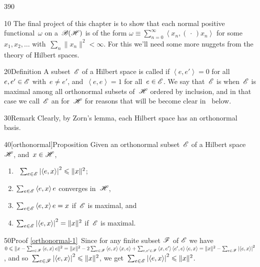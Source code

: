 \begin{parsec}{390}%
\begin{point}{10}%
The final project of this chapter
is to show that each normal positive functional~$\omega$ 
on a~$\mathscr{B}(\mathscr{H})$
	is of the form 
	$\omega\equiv \sum_{n=0}^\infty\left<x_n,(\,\cdot\,)x_n\right>$
	for some~$x_1,x_2,\dotsc$
	with~$\sum_n\|x_n\|^2<\infty$.
For this we'll need some more nuggets
from the theory of Hilbert spaces.
\end{point}
\begin{point}{20}{Definition}%
A subset~$\mathscr{E}$ of a Hilbert space
is called %
if $\left<e,e'\right>=0$
for all~$e,e'\in\mathscr{E}$ with~$e\neq e'$,
and~$\left<e,e\right>=1$
for all~$e\in\mathscr{E}$.
We say that~$\mathscr{E}$ is 
when~$\mathscr{E}$ is maximal
among all orthonormal  subsets of~$\mathscr{H}$
ordered by inclusion,
and in that case
we call~$\mathscr{E}$ an %
for~$\mathscr{H}$
for reasons that will be become clear in~
below.
\begin{point}{30}{Remark}%
Clearly, by Zorn's lemma,
each Hilbert space has an orthonormal basis.
\end{point}
\end{point}
\begin{point}{40}[orthonormal]{Proposition}%
Given an orthonormal subset~$\mathscr{E}$
of a Hilbert space~$\mathscr{H}$,
and~$x\in \mathscr{H}$,
\begin{enumerate}
\item
\label{orthonormal-1}
%
\ 
 $\sum_{e\in \mathscr{E}}\left|\left<e,x\right>\right|^2
\leqslant \|x\|^2$;
\item
\label{orthonormal-2}
$\sum_{e\in \mathscr{E}} \left<e,x\right>e$
converges in~$\mathscr{H}$,
\item
\label{orthonormal-3}
$\sum_{e\in \mathscr{E}} \left<e,x\right>e=x$
if~$\mathscr{E}$ is maximal, and
\item
\label{orthonormal-4}
%
$\sum_{e\in\mathscr{E}}\left|\left<e,x\right>\right|^2 = \|x\|^2$
if~$\mathscr{E}$ is maximal.
\end{enumerate}
\spacingfix%
\begin{point}{50}{Proof}%
\ref{orthonormal-1}\ 
Since for any finite subset $\mathscr{F}$ of $\mathscr{E}$
we have $0\leqslant \|x-\sum_{e\in \mathscr{F}} \left<e,x\right>e\|^2
= \|x\|^2-2\sum_{e\in \mathscr{F}} \left<e,x\right>\left<x,e\right>
+ \sum_{e,e'\in\mathscr{F}} \left<x,e'\right>\left<e',e\right>\left<e,x\right>
= \|x\|^2-\sum_{e\in\mathscr{F}}\left|\left<e,x\right>\right|^2$,
and so~$\sum_{e\in\mathscr{F}} \left|\left<e,x\right>\right|^2\leqslant \|x\|^2$,
we get~$\sum_{e\in\mathscr{E}}\left|\left<e,x\right>\right|^2\leqslant \|x\|^2$.


\end{point}
\end{point}
\end{parsec}

